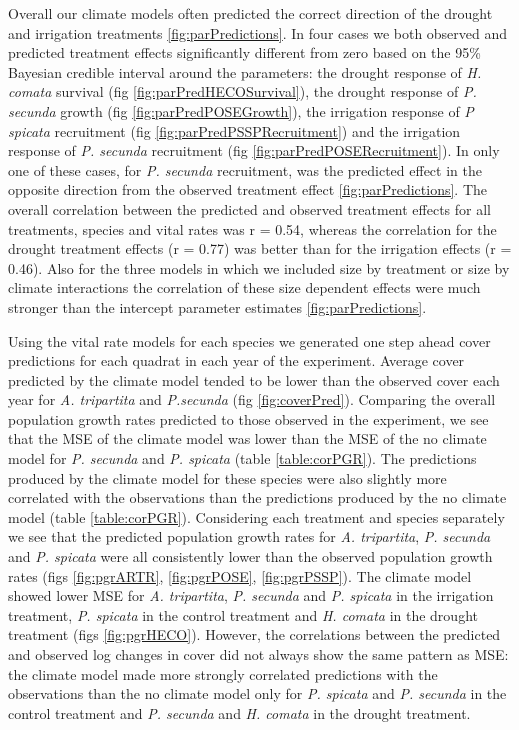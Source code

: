 \documentclass[11pt]{article}
\begin{document}
\begin{doublespacing}
Overall our climate models often predicted the correct direction of the drought and irrigation treatments \ref{fig:parPredictions}. In four cases we both observed and predicted treatment effects significantly different from zero based on the 95\% Bayesian credible interval around the parameters: the drought response of \textit{H. comata} survival (fig \ref{fig:parPredHECOSurvival}), the drought response of \textit{P. secunda} growth (fig \ref{fig:parPredPOSEGrowth}), the irrigation response of \textit{P spicata} recruitment (fig \ref{fig:parPredPSSPRecruitment}) and the irrigation response of \textit{P. secunda} recruitment (fig \ref{fig:parPredPOSERecruitment}).  In only one of these cases, for \textit{P. secunda} recruitment, was the predicted effect in the opposite direction from the observed treatment effect \ref{fig:parPredictions}. The overall correlation between the predicted and observed treatment effects for all treatments, species and vital rates was r = 0.54, whereas the correlation for the drought treatment effects (r = 0.77) was better than for the irrigation effects (r = 0.46).  Also for the three models in which we included size by treatment or size by climate interactions the correlation of these size dependent effects were much stronger than the intercept parameter estimates \ref{fig:parPredictions}.  

Using the vital rate models for each species we generated one step ahead cover predictions for each quadrat in each year of the experiment.  Average cover predicted by the climate model tended to be lower than the observed cover each year for \textit{A. tripartita} and \textit{P.secunda} (fig \ref{fig:coverPred}). Comparing the overall population growth rates predicted to those observed in the experiment, we see that the MSE of the climate model was lower than the MSE of the no climate model for \textit{P. secunda} and \textit{P. spicata} (table \ref{table:corPGR}). The predictions produced by the climate model for these species were also slightly more correlated with the observations than the predictions produced by the no climate model (table \ref{table:corPGR}). Considering each treatment and species separately we see that the predicted population growth rates for \textit{A. tripartita}, \textit{P. secunda} and \textit{P. spicata} were all consistently lower than the observed population growth rates (figs \ref{fig:pgrARTR}, \ref{fig:pgrPOSE}, \ref{fig:pgrPSSP}). The climate model showed lower MSE for \textit{A. tripartita}, \textit{P. secunda} and \textit{P. spicata} in the irrigation treatment, \textit{P. spicata} in the control treatment and \textit{H. comata} in the drought treatment (figs \ref{fig:pgrHECO}).  However, the correlations between the predicted and observed log changes in cover did not always show the same pattern as MSE: the climate model made more strongly correlated predictions with the observations than the no climate model only for \textit{P. spicata} and \textit{P. secunda} in the control treatment and \textit{P. secunda} and \textit{H. comata} in the drought treatment. 
  


\end{doublespacing}
\end{document}
